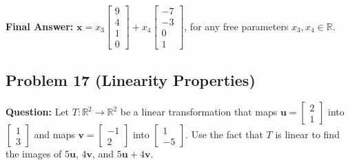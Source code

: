 \documentclass[11pt]{article}
\begin{document}
\textbf{Final Answer:} $\mathbf{x} = x_3\begin{bmatrix} 9 \\ 4 \\ 1 \\ 0 \end{bmatrix} + x_4\begin{bmatrix} -7 \\ -3 \\ 0 \\ 1 \end{bmatrix}$, for any free parameters $x_3, x_4 \in \mathbb{R}$.

\subsection{Problem 17 (Linearity Properties)}
\textbf{Question:} Let $T: \mathbb{R}^2 \to \mathbb{R}^2$ be a linear transformation that maps $\mathbf{u} = \begin{bmatrix} 2 \\ 1 \end{bmatrix}$ into $\begin{bmatrix} 1 \\ 3 \end{bmatrix}$ and maps $\mathbf{v} = \begin{bmatrix} -1 \\ 2 \end{bmatrix}$ into $\begin{bmatrix} 1 \\ -5 \end{bmatrix}$. Use the fact that $T$ is linear to find the images of $5\mathbf{u}$, $4\mathbf{v}$, and $5\mathbf{u} + 4\mathbf{v}$.
\end{document}
